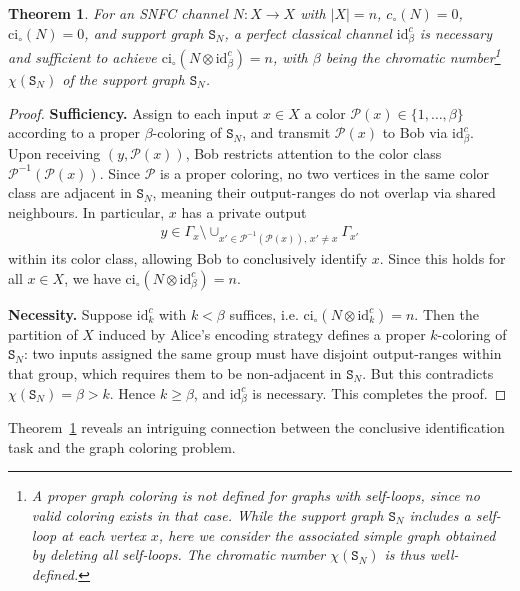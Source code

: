 \documentclass[12pt,a4paper]{article}
\newtheorem{theorem}{Theorem}
\begin{document}
\begin{theorem}\label{theo1}
For an SNFC channel $N : X \to X$ with $|X| = n$, $c_\circ(N)=0$, $\mathrm{ci}_\circ(N) = 0$, and support graph $\mathtt{S}_N$, a perfect classical channel $\mathrm{id}^c_\beta$ is necessary and sufficient to achieve $\mathrm{ci}_\circ(N \otimes \mathrm{id}^c_\beta) = n$, with $\beta$ being the chromatic number\footnote{A proper graph coloring is not defined for graphs with self-loops, since no valid coloring exists in that case. While the support graph $\mathtt{S}_N$ includes a self-loop at each vertex $x$, here we consider the associated simple graph obtained by deleting all self-loops. The chromatic number $\chi(\mathtt{S}_N)$ is thus well-defined.} $\chi(\mathtt{S}_N)$ of the support graph $\mathtt{S}_N$. 
\end{theorem}

\begin{proof}
\textbf{Sufficiency.} Assign to each input $x \in X$ a color $\mathcal{P}(x) \in \{1, \ldots, \beta\}$ according to a proper $\beta$-coloring of $\mathtt{S}_N$, and transmit $\mathcal{P}(x)$ to Bob via $\mathrm{id}^c_\beta$. Upon receiving $(y, \mathcal{P}(x))$, Bob restricts attention to the color class $\mathcal{P}^{-1}(\mathcal{P}(x))$. Since $\mathcal{P}$ is a proper coloring, no two vertices in the same color class are adjacent in $\mathtt{S}_N$, meaning their output-ranges do not overlap via shared neighbours. In particular, $x$ has a private output 
\begin{align*}
y \in \Gamma_x \setminus \cup_{x' \in \mathcal{P}^{-1}(\mathcal{P}(x)),\, x' \neq x} 
\Gamma_{x'}   
\end{align*}
within its color class, allowing Bob to conclusively identify $x$. Since this holds for all $x \in X$, we have $\mathrm{ci}_\circ(N \otimes \mathrm{id}^c_\beta) = n$.

\noindent\textbf{Necessity.} Suppose $\mathrm{id}^c_k$ with $k < \beta$ suffices, i.e. $\mathrm{ci}_\circ(N \otimes \mathrm{id}^c_k)= n$. Then the partition of $X$ induced by Alice's encoding strategy defines a proper $k$-coloring of $\mathtt{S}_N$: two inputs assigned the same group must have disjoint output-ranges within that group, which requires them to be non-adjacent in $\mathtt{S}_N$. But this contradicts $\chi(\mathtt{S}_N) = \beta > k$. Hence $k \geq \beta$, and $\mathrm{id}^c_\beta$ is necessary. This completes the proof.
\end{proof}

\noindent Theorem~\ref{theo1} reveals an intriguing connection between the conclusive identification task and the graph coloring problem.
\end{document}
